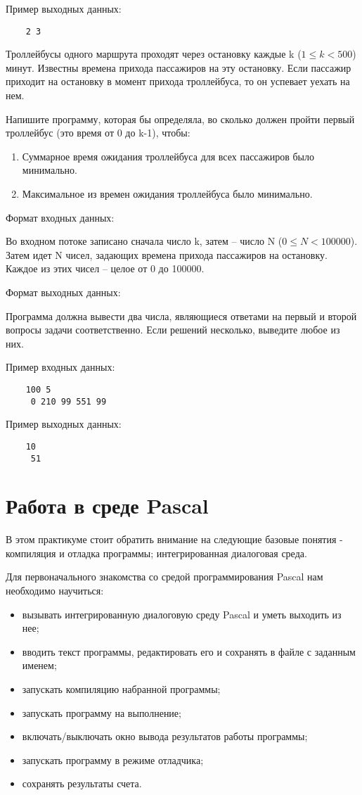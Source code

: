 Пример выходных данных:
\begin{verbatim}
    2 3
\end{verbatim}



Троллейбусы одного маршрута проходят через остановку каждые k ($1 \le k<500$) минут. Известны времена прихода пассажиров на эту остановку. Если пассажир приходит на остановку в момент прихода троллейбуса, то он успевает уехать на нем.

Напишите программу, которая бы определяла, во сколько должен пройти первый троллейбус (это время от 0 до k-1), чтобы:
\begin{enumerate}
  \item  Суммарное время ожидания троллейбуса для всех пассажиров было минимально.
  \item  Максимальное из времен ожидания троллейбуса было минимально.
\end{enumerate}

Формат входных данных:

Во входном потоке записано сначала число k, затем – число N ($0 \le N < 100000$). Затем идет N чисел, задающих времена прихода пассажиров на остановку. Каждое из этих чисел – целое от 0 до 100000.

Формат выходных данных:

Программа должна вывести два числа, являющиеся ответами на первый и второй вопросы задачи соответственно. Если решений несколько, выведите любое из них.

Пример входных данных:
\begin{verbatim}
    100 5
     0 210 99 551 99
\end{verbatim}

Пример выходных данных:
\begin{verbatim}
    10
     51
\end{verbatim}


\section{Работа в среде  Pascal}

В этом практикуме стоит обратить внимание на следующие базовые понятия - компиляция и отладка программы; интегрированная диалоговая среда.

Для первоначального знакомства со средой программирования Pascal нам необходимо научиться:
\begin{itemize}
	\item вызывать интегрированную диалоговую среду Pascal и уметь выходить из нее;
	\item вводить текст программы, редактировать его и сохранять в файле с заданным именем;
	\item запускать компиляцию набранной программы;
	\item запускать программу на выполнение;
	\item включать/выключать окно вывода результатов работы программы;
	\item запускать программу в режиме отладчика;
	\item сохранять результаты счета.
\end{itemize}

